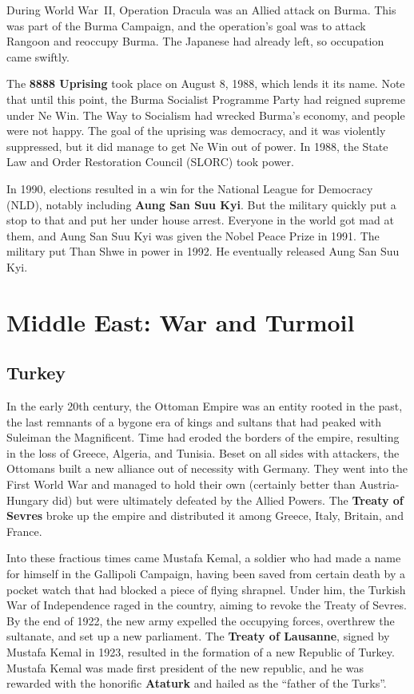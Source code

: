 During World War~II, Operation Dracula was an Allied attack on Burma.
This was part of the Burma Campaign, and the operation's goal was to attack Rangoon and reoccupy Burma.
The Japanese had already left, so occupation came swiftly.

The \textbf{8888 Uprising} took place on August 8, 1988, which lends it its name.
Note that until this point, the Burma Socialist Programme Party had reigned supreme under Ne Win.
The Way to Socialism had wrecked Burma's economy, and people were not happy.
The goal of the uprising was democracy, and it was violently suppressed,
but it did manage to get Ne Win out of power.
In 1988, the State Law and Order Restoration Council (SLORC) took power.

In 1990, elections resulted in a win for the National League for Democracy (NLD),
notably including \textbf{Aung San Suu Kyi}.
But the military quickly put a stop to that and put her under house arrest.
Everyone in the world got mad at them, and Aung San Suu Kyi was given the Nobel Peace Prize in 1991.
The military put Than Shwe in power in 1992.
He eventually released Aung San Suu Kyi.

\section{Middle East: War and Turmoil}

\subsection*{Turkey}

In the early 20th century, the Ottoman Empire was an entity rooted in the past,
the last remnants of a bygone era of kings and sultans that had peaked with Suleiman the Magnificent.
Time had eroded the borders of the empire, resulting in the loss of Greece, Algeria, and Tunisia.
Beset on all sides with attackers, the Ottomans built a new alliance out of necessity with Germany.
They went into the First World War and managed to hold their own (certainly better than Austria-Hungary did)
but were ultimately defeated by the Allied Powers.
The \textbf{Treaty of Sevres} broke up the empire and distributed it among Greece, Italy, Britain, and France.

Into these fractious times came Mustafa Kemal,
a soldier who had made a name for himself in the Gallipoli Campaign,
having been saved from certain death by a pocket watch that had blocked a piece of flying shrapnel.
Under him, the Turkish War of Independence raged in the country, aiming to revoke the Treaty of Sevres.
By the end of 1922, the new army expelled the occupying forces, overthrew the sultanate,
and set up a new parliament.
The \textbf{Treaty of Lausanne}, signed by Mustafa Kemal in 1923,
resulted in the formation of a new Republic of Turkey.
Mustafa Kemal was made first president of the new republic,
and he was rewarded with the honorific \textbf{Ataturk} and hailed as the ``father of the Turks''.

